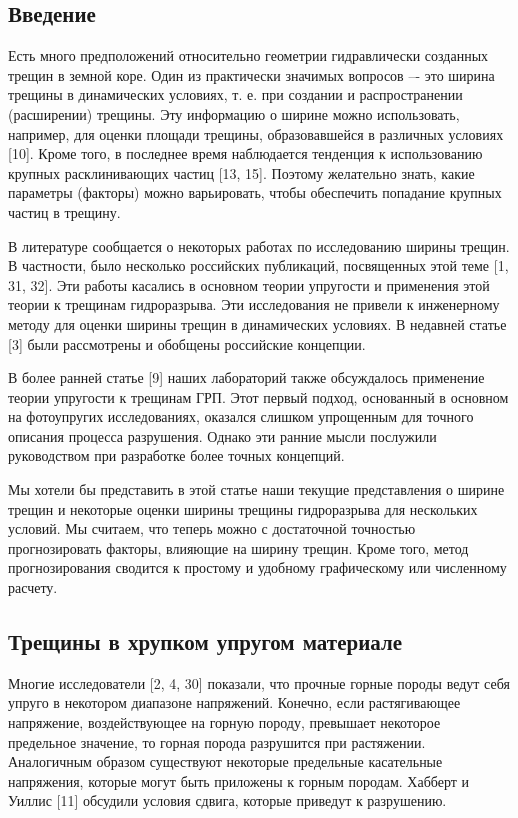 \documentclass[a4paper, 12pt]{article}
\begin{document}
\subsection{Введение}

Есть много предположений относительно геометрии гидравлически созданных трещин в земной коре.
Один из практически значимых вопросов –- это ширина трещины в динамических условиях, т. е. при создании и распространении (расширении) трещины.
Эту информацию о ширине можно использовать, например, для оценки площади трещины, образовавшейся в различных условиях [10].
Кроме того, в последнее время наблюдается тенденция к использованию крупных расклинивающих частиц [13, 15].
Поэтому желательно знать, какие параметры (факторы) можно варьировать, чтобы обеспечить попадание крупных частиц в трещину.

В литературе сообщается о некоторых работах по исследованию ширины трещин.
В частности, было несколько российских публикаций, посвященных этой теме [1, 31, 32].
Эти работы касались в основном теории упругости и применения этой теории к трещинам гидроразрыва.
Эти исследования не привели к инженерному методу для оценки ширины трещин в динамических условиях.
В недавней статье [3] были рассмотрены и обобщены российские концепции.

В более ранней статье [9] наших лабораторий также обсуждалось применение теории упругости к трещинам ГРП.
Этот первый подход, основанный в основном на фотоупругих исследованиях, оказался слишком упрощенным для точного описания процесса разрушения.
Однако эти ранние мысли послужили руководством при разработке более точных концепций.

Мы хотели бы представить в этой статье наши текущие представления о ширине трещин и некоторые оценки ширины трещины гидроразрыва для нескольких условий.
Мы считаем, что теперь можно с достаточной точностью прогнозировать факторы, влияющие на ширину трещин.
Кроме того, метод прогнозирования сводится к простому и удобному графическому или численному расчету.

\subsection{Трещины в хрупком упругом материале}

Многие исследователи [2, 4, 30] показали, что прочные горные породы ведут себя упруго в некотором диапазоне напряжений.
Конечно, если растягивающее напряжение, воздействующее на горную породу, превышает некоторое предельное значение, то горная порода разрушится при растяжении.
Аналогичным образом существуют некоторые предельные касательные напряжения, которые могут быть приложены к горным породам.
Хабберт и Уиллис [11] обсудили условия сдвига, которые приведут к разрушению.
\end{document}
